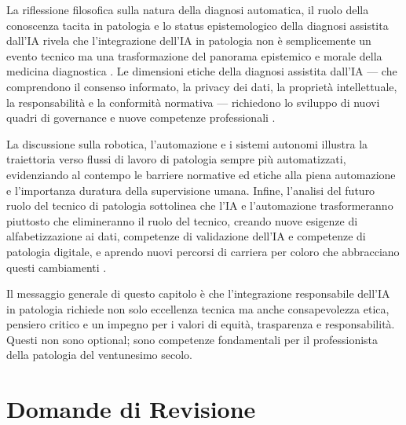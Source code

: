 La riflessione filosofica sulla natura della diagnosi automatica, il ruolo della conoscenza tacita in patologia e lo status epistemologico della diagnosi assistita dall'IA rivela che l'integrazione dell'IA in patologia non è semplicemente un evento tecnico ma una trasformazione del panorama epistemico e morale della medicina diagnostica \cite{hanna2024,song2023}. Le dimensioni etiche della diagnosi assistita dall'IA — che comprendono il consenso informato, la privacy dei dati, la proprietà intellettuale, la responsabilità e la conformità normativa — richiedono lo sviluppo di nuovi quadri di governance e nuove competenze professionali \cite{zhang2023,elendu2023}.

La discussione sulla robotica, l'automazione e i sistemi autonomi illustra la traiettoria verso flussi di lavoro di patologia sempre più automatizzati, evidenziando al contempo le barriere normative ed etiche alla piena automazione e l'importanza duratura della supervisione umana. Infine, l'analisi del futuro ruolo del tecnico di patologia sottolinea che l'IA e l'automazione trasformeranno piuttosto che elimineranno il ruolo del tecnico, creando nuove esigenze di alfabetizzazione ai dati, competenze di validazione dell'IA e competenze di patologia digitale, e aprendo nuovi percorsi di carriera per coloro che abbracciano questi cambiamenti \cite{bankhead2022,song2023}.

Il messaggio generale di questo capitolo è che l'integrazione responsabile dell'IA in patologia richiede non solo eccellenza tecnica ma anche consapevolezza etica, pensiero critico e un impegno per i valori di equità, trasparenza e responsabilità. Questi non sono optional; sono competenze fondamentali per il professionista della patologia del ventunesimo secolo.

\section{Domande di Revisione}
\label{sec:ch5_questions}

